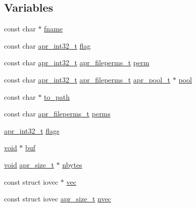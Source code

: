 \subsection*{Variables}
\begin{DoxyCompactItemize}
\item 
const char $\ast$ \hyperlink{group__apr__file__io_ga6a2fc0c236288b07ce5bd1335ca89fa2}{fname}
\item 
const char \hyperlink{group__apr__platform_ga21ef1e35fd3ff9be386f3cb20164ff02}{apr\+\_\+int32\+\_\+t} \hyperlink{group__apr__file__io_ga369aab3d9c81d361edfc877cd50e47c0}{flag}
\item 
const char \hyperlink{group__apr__platform_ga21ef1e35fd3ff9be386f3cb20164ff02}{apr\+\_\+int32\+\_\+t} \hyperlink{group__apr__file__info_ga3af19c4c47007169064a70f9351bc7d8}{apr\+\_\+fileperms\+\_\+t} \hyperlink{group__apr__file__io_gaa8065a83f4f6501dc243d0c894030278}{perm}
\item 
const char \hyperlink{group__apr__platform_ga21ef1e35fd3ff9be386f3cb20164ff02}{apr\+\_\+int32\+\_\+t} \hyperlink{group__apr__file__info_ga3af19c4c47007169064a70f9351bc7d8}{apr\+\_\+fileperms\+\_\+t} \hyperlink{structapr__pool__t}{apr\+\_\+pool\+\_\+t} $\ast$ \hyperlink{group__apr__file__io_ga35230907c170df5d4d7f0ca99274c574}{pool}
\item 
const char $\ast$ \hyperlink{group__apr__file__io_gade8b1804d30cef013de36302728fd81c}{to\+\_\+path}
\item 
const char \hyperlink{group__apr__file__info_ga3af19c4c47007169064a70f9351bc7d8}{apr\+\_\+fileperms\+\_\+t} \hyperlink{group__apr__file__io_ga1a04dd4c8d58f3a54ba16d47d78ba04c}{perms}
\item 
\hyperlink{group__apr__platform_ga21ef1e35fd3ff9be386f3cb20164ff02}{apr\+\_\+int32\+\_\+t} \hyperlink{group__apr__file__io_gac16a2ffc0f356916a4e49b5f90a6127d}{flags}
\item 
\hyperlink{group__MOD__ISAPI_gacd6cdbf73df3d9eed42fa493d9b621a6}{void} $\ast$ \hyperlink{group__apr__file__io_ga0ccd7535cf45ea4a389b855324c47142}{buf}
\item 
\hyperlink{group__MOD__ISAPI_gacd6cdbf73df3d9eed42fa493d9b621a6}{void} \hyperlink{group__apr__platform_gaaa72b2253f6f3032cefea5712a27540e}{apr\+\_\+size\+\_\+t} $\ast$ \hyperlink{group__apr__file__io_gaf0c13da0f13a4ee51a11fd8ab1a5213c}{nbytes}
\item 
const struct iovec $\ast$ \hyperlink{group__apr__file__io_ga026ee9293cfdb03a3944adbd192f1ead}{vec}
\item 
const struct iovec \hyperlink{group__apr__platform_gaaa72b2253f6f3032cefea5712a27540e}{apr\+\_\+size\+\_\+t} \hyperlink{group__apr__file__io_gafab9e6114620026b2558f6ef267d9d8c}{nvec}

\end{DoxyCompactItemize}
